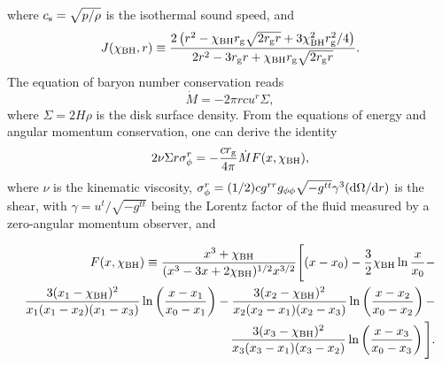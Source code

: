 where $c_{\rm s}=\sqrt{p/\rho}$ is the isothermal sound speed, and
\begin{equation}
	J(\chi_{\rm BH},r) \equiv \frac{2\left(r^2 - \chi_{\rm BH} r_{\rm g}\sqrt{2r_{\rm g}r}+ 3\chi_{\rm BH}^2 r_{\rm g}^2 / 4 \right)}{2r^2 - 3r_{\rm g}r + \chi_{\rm BH} r_{\rm g}\sqrt{2r_{\rm g}r}}.
\end{equation}
The equation of baryon number conservation reads
\begin{equation}
	\dot{M} = -2\pi r c u^r \Sigma, \label{eq:baryon_conservation}
\end{equation}
where $\Sigma = 2H\rho$ is the disk surface density. From the equations of energy and angular momentum conservation, one can derive the identity \cite{page_disk-accretion_1974,chen_neutrino-cooled_2007}
\begin{equation}
	2\nu \Sigma r \sigma^{r}_\phi = -\frac{c r_{\rm g}}{4\pi} \dot{M} F(x,\chi_{\rm BH}), \label{eq:shear_identity}
\end{equation}
where $\nu$ is the kinematic viscosity, $\sigma^r_\phi = (1/2) c g^{rr} g_{\phi\phi}\sqrt{-g^{tt}}\gamma^3 ({\rm d}\Omega/{\rm d}r)$ is the shear, with $\gamma=u^t/\sqrt{-g^{tt}}$ being the Lorentz factor of the fluid measured by a zero-angular momentum observer, and

\begin{equation}
\begin{split}
F(x,\chi_{\rm BH}) \equiv \frac{x^3 + \chi_{\rm BH}}{(x^3 - 3x + 2\chi_{\rm BH})^{1/2}x^{3/2}} \Bigg[ (x-x_0)-\frac{3}{2}\chi_{\rm BH} \ln\frac{x}{x_0}- \\ \frac{3(x_1-\chi_{\rm BH})^2}{x_1(x_1-x_2)(x_1-x_3)}\ln\left(\frac{x-x_1}{x_0-x_1}\right) - \frac{3(x_2-\chi_{\rm BH})^2}{x_2(x_2-x_1)(x_2-x_3)}\ln\left(\frac{x-x_2}{x_0-x_2}\right) - \\ \frac{3(x_3-\chi_{\rm BH})^2}{x_3(x_3-x_1)(x_3-x_2)}\ln\left(\frac{x-x_3}{x_0-x_3}\right)\Bigg]. \label{eq:F_x}
\end{split}
\end{equation}

